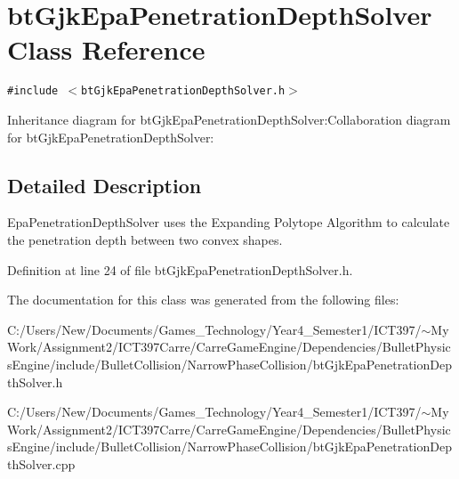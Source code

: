 \hypertarget{classbt_gjk_epa_penetration_depth_solver}{
\section{btGjkEpaPenetrationDepthSolver Class Reference}
\label{classbt_gjk_epa_penetration_depth_solver}
}
{\tt \#include $<$btGjkEpaPenetrationDepthSolver.h$>$}

Inheritance diagram for btGjkEpaPenetrationDepthSolver:Collaboration diagram for btGjkEpaPenetrationDepthSolver:

\subsection{Detailed Description}
EpaPenetrationDepthSolver uses the Expanding Polytope Algorithm to calculate the penetration depth between two convex shapes. 

Definition at line 24 of file btGjkEpaPenetrationDepthSolver.h.

The documentation for this class was generated from the following files:\begin{CompactItemize}
\item 
C:/Users/New/Documents/Games\_\-Technology/Year4\_\-Semester1/ICT397/$\sim$My Work/Assignment2/ICT397Carre/CarreGameEngine/Dependencies/BulletPhysicsEngine/include/BulletCollision/NarrowPhaseCollision/btGjkEpaPenetrationDepthSolver.h\item 
C:/Users/New/Documents/Games\_\-Technology/Year4\_\-Semester1/ICT397/$\sim$My Work/Assignment2/ICT397Carre/CarreGameEngine/Dependencies/BulletPhysicsEngine/include/BulletCollision/NarrowPhaseCollision/btGjkEpaPenetrationDepthSolver.cpp\end{CompactItemize}
